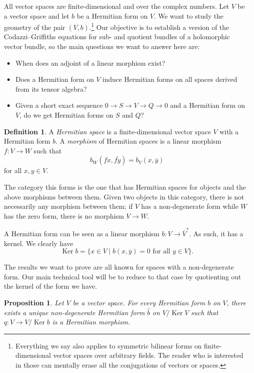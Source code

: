 \documentclass[10pt,a4paper]{amsart}
\newtheorem{prop}[theo]{Proposition}
\theoremstyle{definition}
\newtheorem{defi}[theo]{Definition}
\def\ov#1{\overline{#1}}
\DeclareMathOperator{\Ker}{Ker}
\begin{document}
All vector spaces are finite-dimensional and over the complex numbers. Let $V$ be a vector space and let $b$ be a Hermitian form on $V$. We want to study the geometry of the pair $(V,b)$.\footnote{Everything we say also applies to symmetric bilinear forms on finite-dimensional vector spaces over arbitrary fields. The reader who is interested in those can mentally erase all the conjugations of vectors or spaces.}
Our objective is to establish a version of the Codazzi--Griffiths equations for sub- and quotient bundles of a holomorphic vector bundle, so the main questions we want to answer here are:
\begin{itemize}
\item
When does an adjoint of a linear morphism exist?

\item
Does a Hermitian form on $V$ induce Hermitian forms on all spaces derived from its tensor algebra?

\item
Given a short exact sequence $0 \to S \to V \to Q \to 0$ and a Hermitian form on $V$, do we get Hermitian forms on $S$ and $Q$?
\end{itemize}


\begin{defi}
A \emph{Hermitian space} is a finite-dimensional vector space $V$ with a Hermitian form $b$.
A \emph{morphism} of Hermitian spaces is a linear morphism $f : V \to W$ such that
\[
b_W(fx, \ov{fy}) = b_V(x, \ov y)
\]
for all $x, y \in V$.
\end{defi}

The category this forms is the one that has Hermitian spaces for objects and the above morphisms between them. Given two objects in this category, there is not necessarily any morphism between them; if $V$ has a non-degenerate form while $W$ has the zero form, there is no morphism $V \to W$.

A Hermitian form can be seen as a linear morphism $b : V \to \ov V^*$. As such, it has a kernel. We clearly have
\[
\Ker b = \{ x \in V \mid b(x, \ov y) = 0 \text{ for all $y \in V$}\}.
\]


The results we want to prove are all known for spaces with a non-degenerate form. Our main technical tool will be to reduce to that case by quotienting out the kernel of the form we have.

\begin{prop}
Let $V$ be a vector space. For every Hermitian form $b$ on $V$, there exists a unique non-degenerate Hermitian form $\hat b$ on $V / \Ker V$ such that $q : V \to V/\Ker b$ is a Hermitian morphism.
\end{prop}
\end{document}
